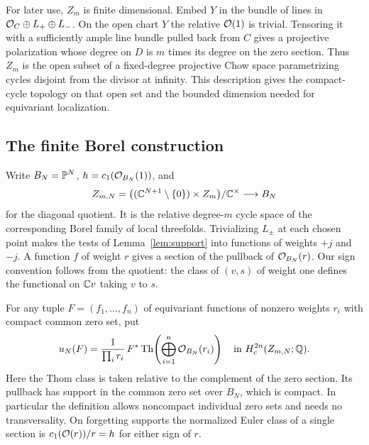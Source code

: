 For later use, $Z_m$ is finite dimensional. Embed $Y$ in the bundle
of lines in $\mathcal O_C\oplus L_+\oplus L_-$. On the open chart $Y$
the relative $\mathcal O(1)$ is trivial. Tensoring it with a sufficiently
ample line bundle pulled back from $C$ gives a projective
polarization whose degree on $D$ is $m$ times its degree on the
zero section. Thus $Z_m$ is the open subset of a fixed-degree
projective Chow space parametrizing cycles disjoint from the divisor
at infinity. This description gives the compact-cycle topology on
that open set and the bounded dimension needed for equivariant
localization.

\subsection{The finite Borel construction}
Write $B_N=\mathbb P^N$, $h=c_1(\mathcal O_{B_N}(1))$, and
\[
 Z_{m,N}=\big((\mathbb C^{N+1}\setminus\{0\})\times Z_m\big)/\mathbb C^\times
        \longrightarrow B_N
\]
for the diagonal quotient. It is the relative degree-$m$ cycle
space of the corresponding Borel family of local threefolds.
Trivializing $L_\pm$ at each chosen point makes the tests of
Lemma~\ref{lem:support} into functions of weights $+j$ and $-j$.
A function $f$ of weight $r$ gives a section of the pullback of
$\mathcal O_{B_N}(r)$. Our sign convention follows from the quotient:
the class of $(v,s)$ of weight one defines the functional on
$\mathbb C v$ taking $v$ to $s$.

For any tuple $F=(f_1,\ldots,f_n)$ of equivariant functions of
nonzero weights $r_i$ with compact common zero set, put
\begin{equation}\label{eq:cut}
 u_N(F)=\frac{1}{\prod_i r_i}\,
    F^*\operatorname{Th}\!\left(\bigoplus_{i=1}^{n}\mathcal O_{B_N}(r_i)\right)
        \quad\text{in } H_c^{2n}(Z_{m,N};\mathbb Q).
\end{equation}
Here the Thom class is taken relative to the complement of the
zero section. Its pullback has support in the common zero set over
$B_N$, which is compact. In particular the definition allows
noncompact individual zero sets and needs no transversality. On
forgetting supports the normalized Euler class of a single section
is $c_1(\mathcal O(r))/r=h$ for either sign of $r$.


